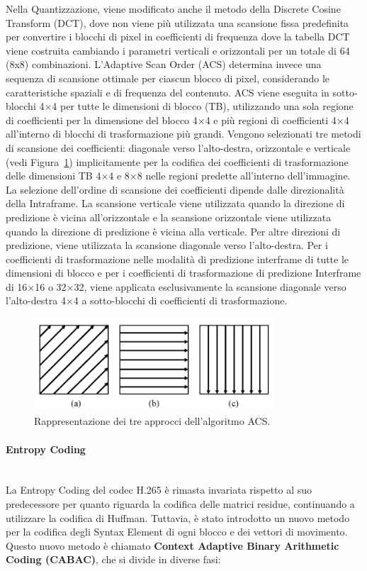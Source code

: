 \documentclass[a4paper,12pt, oneside]{article}
\begin{document}
Nella Quantizzazione, viene modificato anche il metodo della Discrete Cosine Transform (DCT), dove non viene
più utilizzata una scansione fissa predefinita per convertire i blocchi di pixel in coefficienti di frequenza
dove la tabella DCT viene costruita cambiando i parametri verticali e orizzontali per un totale di 64 (8x8)
combinazioni.
L'Adaptive Scan Order (ACS) determina invece una sequenza di scansione ottimale per ciascun blocco di pixel,
considerando le caratteristiche spaziali e di frequenza del contenuto. ACS viene eseguita in sotto-blocchi
4×4 per tutte le dimensioni di blocco (TB), utilizzando una sola regione di coefficienti per la dimensione
del blocco 4×4 e più regioni di coefficienti 4×4 all'interno di blocchi di trasformazione più grandi. Vengono
selezionati tre metodi di scansione dei coefficienti: diagonale verso l'alto-destra, orizzontale e verticale
(vedi Figura~\ref{fig:HEVC_ACS}) implicitamente per la codifica dei coefficienti di trasformazione delle
dimensioni TB 4×4 e 8×8 nelle regioni predette all'interno dell'immagine. La selezione dell'ordine di
scansione dei coefficienti dipende dalle direzionalità della Intraframe. La scansione verticale viene
utilizzata quando la direzione di predizione è vicina all'orizzontale e la scansione orizzontale viene
utilizzata quando la direzione di predizione è vicina alla verticale. Per altre direzioni di predizione,
viene utilizzata la scansione diagonale verso l'alto-destra. Per i coefficienti di trasformazione nelle
modalità di predizione interframe di tutte le dimensioni di blocco e per i coefficienti di trasformazione
di predizione Interframe di 16×16 o 32×32, viene applicata esclusivamente la scansione diagonale verso
l'alto-destra 4×4 a sotto-blocchi di coefficienti di trasformazione.

\begin{figure}[h]
    \centering
    \includegraphics[width=0.8\textwidth]{images/HEVC-ACS.png}
    \caption{Rappresentazione dei tre approcci dell'algoritmo ACS.}
    \label{fig:HEVC_ACS}
\end{figure}

\paragraph{Entropy Coding}\hphantom{A}\\
La Entropy Coding del codec H.265 è rimasta invariata rispetto al suo predecessore per quanto riguarda
la codifica delle matrici residue, continuando a utilizzare la codifica di Huffman. Tuttavia, è stato
introdotto un nuovo metodo per la codifica degli Syntax Element di ogni blocco e dei vettori di movimento.
Questo nuovo metodo è chiamato \textbf{Context Adaptive Binary Arithmetic Coding (CABAC)}, che si divide
in diverse fasi:
\end{document}
